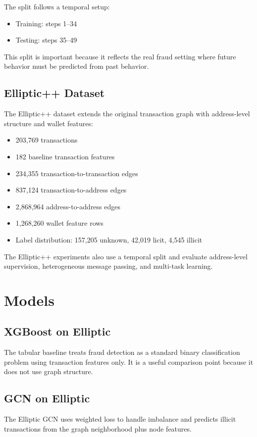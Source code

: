 \documentclass[11pt,a4paper]{article}
\begin{document}
The split follows a temporal setup:
\begin{itemize}[noitemsep]
    \item Training: steps 1--34
    \item Testing: steps 35--49
\end{itemize}

This split is important because it reflects the real fraud setting where future behavior must be predicted from past behavior.

\subsection{Elliptic++ Dataset}
The Elliptic++ dataset extends the original transaction graph with address-level structure and wallet features:
\begin{itemize}[noitemsep]
    \item 203,769 transactions
    \item 182 baseline transaction features
    \item 234,355 transaction-to-transaction edges
    \item 837,124 transaction-to-address edges
    \item 2,868,964 address-to-address edges
    \item 1,268,260 wallet feature rows
    \item Label distribution: 157,205 unknown, 42,019 licit, 4,545 illicit
\end{itemize}

The Elliptic++ experiments also use a temporal split and evaluate address-level supervision, heterogeneous message passing, and multi-task learning.

\section{Models}

\subsection{XGBoost on Elliptic}
The tabular baseline treats fraud detection as a standard binary classification problem using transaction features only. It is a useful comparison point because it does not use graph structure.

\subsection{GCN on Elliptic}
The Elliptic GCN uses weighted loss to handle imbalance and predicts illicit transactions from the graph neighborhood plus node features.
\end{document}
